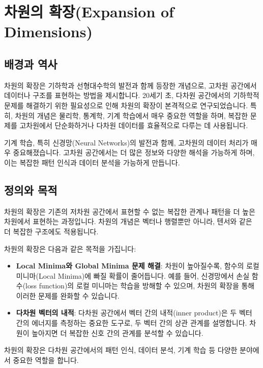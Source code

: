 \section{차원의 확장(Expansion of Dimensions)}

\subsection{배경과 역사}
차원의 확장은 기하학과 선형대수학의 발전과 함께 등장한 개념으로, 고차원 공간에서 데이터나 구조를 표현하는 방법을 제시합니다. 20세기 초, 다차원 공간에서의 기하학적 문제를 해결하기 위한 필요성으로 인해 차원의 확장이 본격적으로 연구되었습니다. 특히, 차원의 개념은 물리학, 통계학, 기계 학습에서 매우 중요한 역할을 하며, 복잡한 문제를 고차원에서 단순화하거나 다차원 데이터를 효율적으로 다루는 데 사용됩니다.

\vspace{1\baselineskip}
\noindent 기계 학습, 특히 신경망(Neural Networks)의 발전과 함께, 고차원의 데이터 처리가 매우 중요해졌습니다. 고차원 공간에서는 더 많은 정보와 다양한 해석을 가능하게 하며, 이는 복잡한 패턴 인식과 데이터 분석을 가능하게 만듭니다.

\subsection{정의와 목적}
차원의 확장은 기존의 저차원 공간에서 표현할 수 없는 복잡한 관계나 패턴을 더 높은 차원에서 표현하는 과정입니다. 차원의 개념은 벡터나 행렬뿐만 아니라, 텐서와 같은 더 복잡한 구조에도 적용됩니다.

\vspace{1\baselineskip}
\noindent 차원의 확장은 다음과 같은 목적을 가집니다:

\begin{itemize}
  \item \textbf{Local Minima와 Global Minima 문제 해결}: 차원이 높아질수록, 함수의 로컬 미니마(Local Minima)에 빠질 확률이 줄어듭니다. 예를 들어, 신경망에서 손실 함수(loss function)의 로컬 미니마는 학습을 방해할 수 있으며, 차원의 확장을 통해 이러한 문제를 완화할 수 있습니다.

  \item \textbf{다차원 벡터의 내적}: 다차원 공간에서 벡터 간의 내적(inner product)은 두 벡터 간의 에너지를 측정하는 중요한 도구로, 두 벡터 간의 상관 관계를 설명합니다. 차원이 높아지면 더 복잡한 신호 간의 관계를 분석할 수 있습니다.
\end{itemize}

\vspace{1\baselineskip}
\noindent 차원의 확장은 다차원 공간에서의 패턴 인식, 데이터 분석, 기계 학습 등 다양한 분야에서 중요한 역할을 합니다.

